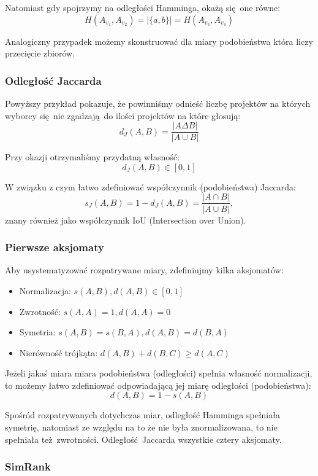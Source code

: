 \documentclass{article}
\begin{document}
Natomiast gdy spojrzymy na odległości Hamminga, okażą się one równe:
\[ H(A_{v_1},A_{v_2}) = |\{a,b\}| = H(A_{v_3},A_{v_4}) \]

Analogiczny przypadek możemy skonstruować dla miary podobieństwa która liczy
przecięcie zbiorów.

\subsubsection{Odległość Jaccarda}

Powyższy przykład pokazuje, że powinniśmy odnieść liczbę projektów na których
wyborcy się nie zgadzają do ilości projektów na które głosują:
\[ d_J(A,B) = \frac{|A \Delta B|}{|A \cup B|} \]

Przy okazji otrzymaliśmy przydatną własność:
\[ d_J(A,B) \in [0, 1] \]

W związku z czym łatwo zdefiniować współczynnik (podobieństwa) Jaccarda:
\[ s_J(A,B) = 1 - d_J(A,B) = \frac{|A \cap B|}{|A \cup B|}, \]
znany również jako współczynnik IoU (Intersection over Union).

\subsubsection*{Pierwsze aksjomaty}

Aby usystematyzować rozpatrywane miary, zdefiniujmy kilka aksjomatów:

\begin{itemize}
  \item Normalizacja: $s(A,B),d(A,B) \in [0, 1]$
  \item Zwrotność: $s(A,A) = 1, d(A,A) = 0$
  \item Symetria: $s(A,B) = s(B,A), d(A,B) = d(B,A)$
  \item Nierówność trójkąta: $d(A,B) + d(B,C) \geq d(A,C)$
\end{itemize}

Jeżeli jakaś miara miara podobieństwa (odległości) spełnia własność
normalizacji, to możemy łatwo zdefiniować odpowiadającą jej miarę odległości
(podobieństwa):
\[ d(A,B) = 1 - s(A,B) \]

Spośród rozpatrywanych dotychczas miar, odległość Hamminga spełniała
symetrię, natomiast ze względu na to że nie była znormalizowana, to nie
spełniała też zwrotności. Odległość Jaccarda wszystkie cztery aksjomaty.

\subsubsection{SimRank}
\end{document}
